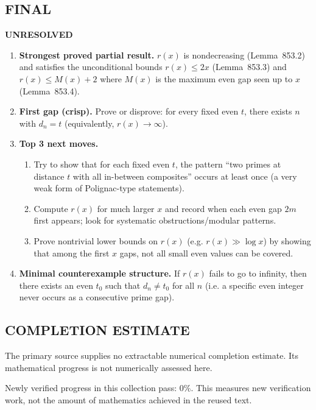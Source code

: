 \subsection*{FINAL}
\textbf{UNRESOLVED}
\begin{enumerate}
\item[(i)] \textbf{Strongest proved partial result.} $r(x)$ is nondecreasing (Lemma~853.2) and satisfies the unconditional bounds $r(x)\le 2x$ (Lemma~853.3) and $r(x)\le M(x)+2$ where $M(x)$ is the maximum even gap seen up to $x$ (Lemma~853.4).
\item[(ii)] \textbf{First gap (crisp).} Prove or disprove: for every fixed even $t$, there exists $n$ with $d_n=t$ (equivalently, $r(x)\to\infty$).
\item[(iii)] \textbf{Top 3 next moves.}
  \begin{enumerate}
  \item Try to show that for each fixed even $t$, the pattern ``two primes at distance $t$ with all in-between composites'' occurs at least once (a very weak form of Polignac-type statements).
  \item Compute $r(x)$ for much larger $x$ and record when each even gap $2m$ first appears; look for systematic obstructions/modular patterns.
  \item Prove nontrivial lower bounds on $r(x)$ (e.g. $r(x)\gg \log x$) by showing that among the first $x$ gaps, not all small even values can be covered.
  \end{enumerate}
\item[(iv)] \textbf{Minimal counterexample structure.} If $r(x)$ fails to go to infinity, then there exists an even $t_0$ such that $d_n\ne t_0$ for all $n$ (i.e. a specific even integer never occurs as a consecutive prime gap).
\end{enumerate}



\subsection*{COMPLETION ESTIMATE}
The primary source supplies no extractable numerical completion estimate. Its mathematical progress is not numerically assessed here.

Newly verified progress in this collection pass: $0\%$. This measures new verification work, not the amount of mathematics achieved in the reused text.
